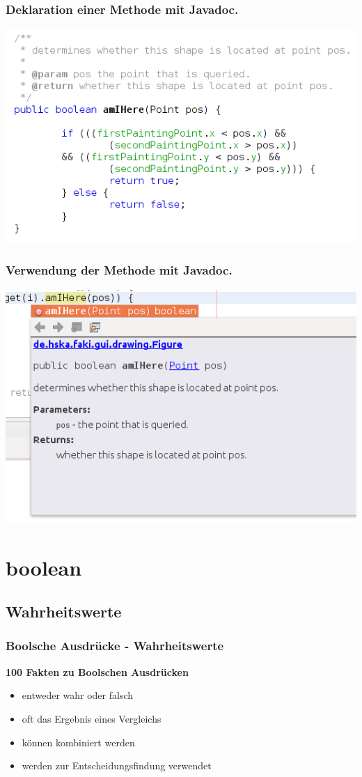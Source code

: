 \documentclass[final]{beamer}
\begin{document}
\begin{frame}
	\frametitle{Deklaration einer Methode mit Javadoc.}
	\includegraphics[scale=0.5]{JavaDoc_example_1_1.png}
\end{frame}

\begin{frame}
	\frametitle{Verwendung der Methode mit Javadoc.}
	\includegraphics[scale=0.5]{JavaDoc_example_2_1.png}
\end{frame}

\section{boolean}
\subsection{Wahrheitswerte}
\begin{frame}
	\frametitle{Boolsche Ausdrücke - Wahrheitswerte}
	\textbf{100 Fakten zu Boolschen Ausdrücken}
	\begin{itemize}
		\item{entweder wahr oder falsch}
		\item{oft das Ergebnis eines Vergleichs}
		\item{können kombiniert werden}
		\item{werden zur Entscheidungsfindung verwendet}
	\end{itemize}
\end{frame}
\end{document}
